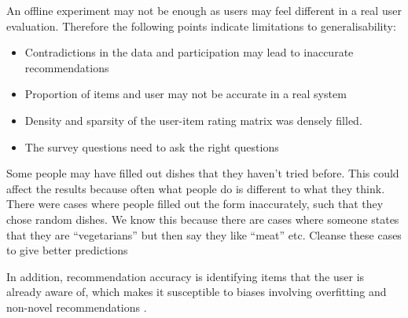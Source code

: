 An offline experiment may not be enough as users may feel different in a real user evaluation. Therefore the following points indicate limitations to generalisability:
\begin{itemize}
	\item{Contradictions in the data and participation may lead to inaccurate recommendations}
	\item{Proportion of items and user may not be accurate in a real system}
	\item{Density and sparsity of the user-item rating matrix was densely filled.}
	\item{The survey questions need to ask the right questions}
\end{itemize}
Some people may have filled out dishes that they haven't tried before. This could affect the results because often what people do is different to what they think. 
There were cases where people filled out the form inaccurately, such that they chose random dishes. We know this because there are cases where someone states that they are “vegetarians” but then say they like “meat” etc.
Cleanse these cases to give better predictions

In addition, recommendation accuracy is identifying items that the user is already aware of, which makes it susceptible to biases involving overfitting and non-novel recommendations \cite{evaluation}. 



